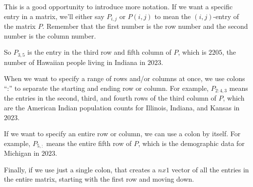 \documentclass{ximera}
\begin{document}
  \begin{remark}

    This is a good opportunity to introduce more notation. If we want a specific entry in a matrix, we'll either say $P_{i,j}$ or $P(i,j)$ to mean the $(i,j)$-entry of the matrix $P$. Remember that the first number is the row number and the second number is the column number.

    So $P_{3,5}$ is the entry in the third row and fifth column of $P$, which is $2205$, the number of Hawaiian people living in Indiana in $2023$.

    When we want to specify a range of rows and/or columns at once, we use colons ``:'' to separate the starting and ending row or column. For example, $P_{2:4,3}$ means the entries in the second, third, and fourth rows of the third column of $P$, which are the American Indian population counts for Illinois, Indiana, and Kansas in $2023$.

    If we want to specify an entire row or column, we can use a colon by itself. For example, $P_{5,:}$ means the entire fifth row of $P$, which is the demographic data for Michigan in $2023$. 

    Finally, if we use just a single colon, that creates a $nx1$ vector of all the entries in the entire matrix, starting with the first row and moving down. 

  \end{remark}
\end{document}
